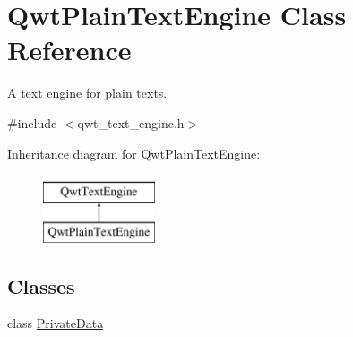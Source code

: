 \hypertarget{class_qwt_plain_text_engine}{\section{Qwt\-Plain\-Text\-Engine Class Reference}
\label{class_qwt_plain_text_engine}
}


A text engine for plain texts.  




{\ttfamily \#include $<$qwt\-\_\-text\-\_\-engine.\-h$>$}

Inheritance diagram for Qwt\-Plain\-Text\-Engine\-:\begin{figure}[H]
\begin{center}
\leavevmode
\includegraphics[height=2.000000cm]{class_qwt_plain_text_engine}
\end{center}
\end{figure}
\subsection*{Classes}
\begin{DoxyCompactItemize}
\item 
class \hyperlink{class_qwt_plain_text_engine_1_1_private_data}{Private\-Data}
\end{DoxyCompactItemize}
